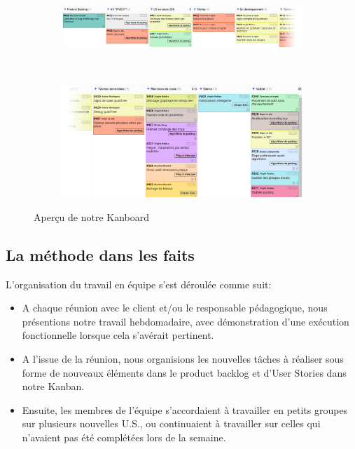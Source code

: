 \begin{figure}[!htb]
    \centering
    \begin{subfigure}{.8\linewidth}
        \centering
        \includegraphics[width=\linewidth]{img/kanboard01.png}
    \end{subfigure}%
    ~ \\
    \begin{subfigure}{.8\linewidth}
        \centering
        \includegraphics[width=\linewidth]{img/kanboard02.png}
    \end{subfigure}
    \caption{Aperçu de notre Kanboard}
    \label{fig:kanboard}
\end{figure}


\subsection{La méthode dans les faits}

L'organisation du travail en équipe s'est déroulée comme suit:
\begin{itemize}
    \item A chaque réunion avec le client et/ou le responsable pédagogique, nous présentions notre travail hebdomadaire, avec démonstration d'une exécution fonctionnelle lorsque cela s'avérait pertinent.
    \item A l'issue de la réunion, nous organisions les nouvelles tâches à réaliser sous forme de nouveaux éléments dans le product backlog et d'User Stories dans notre Kanban.
    \item Ensuite, les membres de l'équipe s'accordaient à travailler en petits groupes sur plusieurs nouvelles U.S., ou continuaient à travailler sur celles qui n'avaient pas été complétées lors de la semaine.\\    
\end{itemize}

